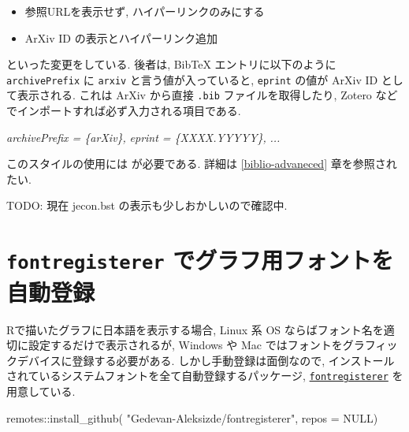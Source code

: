 \documentclass[
]{bxjsbook}
\newenvironment{Shaded}{\begin{snugshade}}{\end{snugshade}}
\newcommand{\AttributeTok}[1]{\textcolor[rgb]{0.77,0.63,0.00}{#1}}
\newcommand{\CommentTok}[1]{\textcolor[rgb]{0.56,0.35,0.01}{\textit{#1}}}
\newcommand{\ConstantTok}[1]{\textcolor[rgb]{0.00,0.00,0.00}{#1}}
\newcommand{\FunctionTok}[1]{\textcolor[rgb]{0.00,0.00,0.00}{#1}}
\newcommand{\NormalTok}[1]{#1}
\newcommand{\SpecialCharTok}[1]{\textcolor[rgb]{0.00,0.00,0.00}{#1}}
\newcommand{\StringTok}[1]{\textcolor[rgb]{0.31,0.60,0.02}{#1}}
\providecommand{\tightlist}{%
  \setlength{\itemsep}{0pt}\setlength{\parskip}{0pt}}
\theoremstyle{definition}
\theoremstyle{definition}
\theoremstyle{definition}
\theoremstyle{remark}
\begin{document}
\begin{itemize}
\tightlist
\item
  参照URLを表示せず, ハイパーリンクのみにする
\item
  ArXiv ID の表示とハイパーリンク追加
\end{itemize}

といった変更をしている. 後者は, BibTeX エントリに以下のように
\texttt{archivePrefix} に \texttt{arxiv} と言う値が入っていると,
\texttt{eprint} の値が ArXiv ID として表示される. これは ArXiv から直接
\texttt{.bib} ファイルを取得したり, Zotero
などでインポートすれば必ず入力される項目である.

\begin{Shaded}
\begin{Highlighting}[]
\CommentTok{archivePrefix = \{arXiv\},}
\CommentTok{eprint = \{XXXX.YYYYY\},}
\CommentTok{...}
\end{Highlighting}
\end{Shaded}

このスタイルの使用には \upBibTeX が必要である. 詳細は
\ref{biblio-advaneced} 章を参照されたい.

TODO: 現在 jecon.bst の表示も少しおかしいので確認中.

\hypertarget{fontregisterer-ux3067ux30b0ux30e9ux30d5ux7528ux30d5ux30a9ux30f3ux30c8ux3092ux81eaux52d5ux767bux9332}{%
\chapter{\texorpdfstring{\texttt{fontregisterer}
でグラフ用フォントを自動登録}{fontregisterer でグラフ用フォントを自動登録}}\label{fontregisterer-ux3067ux30b0ux30e9ux30d5ux7528ux30d5ux30a9ux30f3ux30c8ux3092ux81eaux52d5ux767bux9332}}

Rで描いたグラフに日本語を表示する場合, Linux 系 OS
ならばフォント名を適切に設定するだけで表示されるが, Windows や Mac
ではフォントをグラフィックデバイスに登録する必要がある.
しかし手動登録は面倒なので,
インストールされているシステムフォントを全て自動登録するパッケージ,
\href{https://github.com/Gedevan-Aleksizde/fontregisterer}{\texttt{fontregisterer}}
を用意している.

\begin{Shaded}
\begin{Highlighting}[numbers=left,,]
\NormalTok{remotes}\SpecialCharTok{::}\FunctionTok{install\_github}\NormalTok{(}
  \StringTok{"Gedevan{-}Aleksizde/fontregisterer"}\NormalTok{, }\AttributeTok{repos =} \ConstantTok{NULL}\NormalTok{)}
\end{Highlighting}
\end{Shaded}
\end{document}
